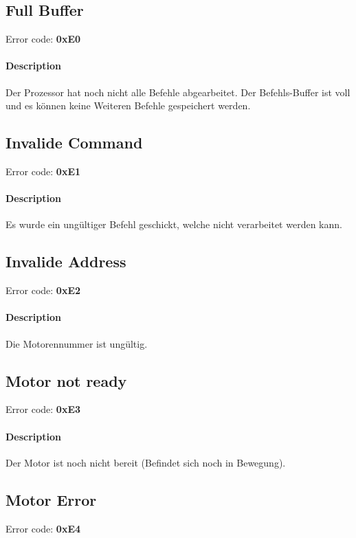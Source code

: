 \documentclass[10pt,a4paper]{article}
\begin{document}
\subsection{Full Buffer}
Error code: \textbf{0xE0}
\paragraph*{Description\\}
Der Prozessor hat noch nicht alle Befehle abgearbeitet. Der Befehls-Buffer ist voll und es können keine Weiteren Befehle gespeichert werden.

\subsection{Invalide Command}

Error code: \textbf{0xE1}
\paragraph*{Description\\}
Es wurde ein ungültiger Befehl geschickt, welche nicht verarbeitet werden kann.

\subsection{Invalide Address}

Error code: \textbf{0xE2}
\paragraph*{Description\\}
Die Motorennummer ist ungültig.

\subsection{Motor not ready}

Error code: \textbf{0xE3}
\paragraph*{Description\\}
Der Motor ist noch nicht bereit (Befindet sich noch in Bewegung).

\subsection{Motor Error}

Error code: \textbf{0xE4}
\end{document}

